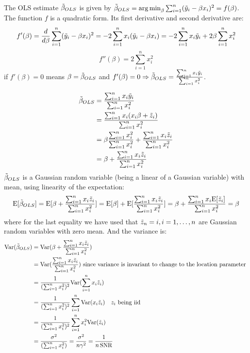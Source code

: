 \documentclass[12pt,twoside]{article}
\begin{document}
\begin{enumerate}
\begin{enumerate}
  \medskip 
 The OLS estimate $\tilde{ \beta }_{OLS}$ is given by $\tilde{ \beta }_{OLS} = \operatorname*{arg\,min}_\beta \sum_{i=1}^n (\tilde{  y }_i - \beta x_i)^2 = f(\beta)$.
 The function $f$ is a quadratic form. Its first derivative and second derivative are:
 $$f'(\beta) = \frac{d}{d\beta}  \sum_{i=1}^n (\tilde{  y }_i - \beta x_i)^2 = -2 \sum_{i=1}^n x_i (\tilde{  y }_i - \beta x_i) = -2  \sum_{i=1}^n  x_i \tilde{  y }_i + 2 \beta  \sum_{i=1}^n x_i^2$$
 $$f''(\beta) = 2  \sum_{i=1}^n x_i^2$$
 if $f'(\beta) = 0$ means $\beta = \tilde{ \beta }_{OLS}$ and  $f'(\beta) =0 \Rightarrow \tilde{ \beta }_{OLS} = \frac{ \sum_{i=1}^n x_i \tilde{  y }_i } {  \sum_{i=1}^n  x_i^2}$.
 
 \begin{align*}
	 \tilde{ \beta }_{OLS}	&=	\frac{ \sum_{i=1}^n x_i \tilde{  y }_i } {  \sum_{i=1}^n  x_i^2} \\
	 				&= 	\frac{ \sum_{i=1}^n x_i  (x_i \beta + \tilde{ z }_i) } {  \sum_{i=1}^n  x_i^2} \\
					&=	\beta \frac{ \sum_{i=1}^n x_i^2} { \sum_{i=1}^n x_i^2}  + \frac{ \sum_{i=1}^n x_i  \tilde{ z }_i} { \sum_{i=1}^n x_i^2} \\
					&=	\beta +  \frac{ \sum_{i=1}^n x_i  \tilde{ z }_i} { \sum_{i=1}^n x_i^2} 
\end{align*}  
 $\tilde{ \beta }_{OLS}$ is a Gaussian random variable (being a linear of a Gaussian variable) with mean, using linearity of the expectation:
 $$\mathrm{E}[\tilde{ \beta }_{OLS}] = \mathrm{E}[\beta +  \frac{ \sum_{i=1}^n x_i  \tilde{ z }_i} { \sum_{i=1}^n x_i^2}] = \mathrm{E}[\beta] + \mathrm{E}[ \frac{ \sum_{i=1}^n x_i  \tilde{ z }_i} { \sum_{i=1}^n x_i^2}] = \beta + \frac{ \sum_{i=1}^n x_i  \mathrm{E}[\tilde{ z }_i]} { \sum_{i=1}^n x_i^2} = \beta$$
  where for the last equality we have used that $\tilde{  z }_n=i, i=1, \dots, n$ are Gaussian random variables with zero mean.
 And the variance is:
 \begin{align*}  
 	\mathrm{Var}{(\tilde{ \beta }_{OLS})}	&=	\mathrm{Var}{	(\beta +  \frac{ \sum_{i=1}^n x_i  \tilde{ z }_i} { \sum_{i=1}^n x_i^2} ) } \\
						&= 	\mathrm{Var}{ (\frac{ \sum_{i=1}^n x_i  \tilde{ z }_i} { \sum_{i=1}^n x_i^2} ) } \text{~since variance is invariant to change to the location parameter } \\
						&=	\frac{1} { (\sum_{i=1}^n x_i^2)^2} \mathrm{Var}{( \sum_{i=1}^n x_i  \tilde{ z }_i )} \\
						&=	\frac{1} { (\sum_{i=1}^n x_i^2)^2} \sum_{i=1}^n \mathrm{Var}{(x_i   \tilde{ z }_i)} \text{ ~ $z_i$ being iid} \\
						&=	\frac{1} { (\sum_{i=1}^n x_i^2)^2} \sum_{i=1}^n x_i^2 \mathrm{Var}{( \tilde{ z }_i )} \\
						&= 	\frac{ \sigma^2} { (\sum_{i=1}^n x_i^2)} = \frac{ \sigma^2} {n \gamma^2 } = \frac{1} {n \operatorname{SNR}}
 \end{align*}  
  

\end{enumerate}
\end{enumerate}
\end{document}

